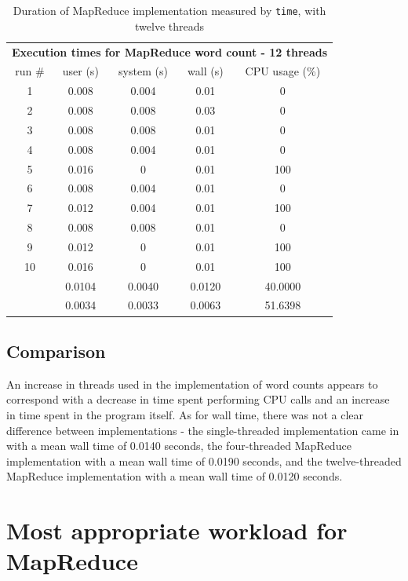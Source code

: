 \documentclass[12pt, letterpaper]{article}
\begin{document}
	\begin{table}[h]
	\centering
	\begin{tabular}{ccccc}
	\multicolumn{5}{c}{\cellcolor[HTML]{FFFFC7}\textbf{Execution times for MapReduce word count - 12 threads}} \\
	\rowcolor[HTML]{EFEFEF} 
	run \# & user (s) & system (s) & wall (s) & CPU usage (\%) \\
	1 & 0.008 & 0.004 & 0.01 & 0 \\
	2 & 0.008 & 0.008 & 0.03 & 0 \\
	3 & 0.008 & 0.008 & 0.01 & 0 \\
	4 & 0.008 & 0.004 & 0.01 & 0 \\
	5 & 0.016 & 0 & 0.01 & 100 \\
	6 & 0.008 & 0.004 & 0.01 & 0 \\
	7 & 0.012 & 0.004 & 0.01 & 100 \\
	8 & 0.008 & 0.008 & 0.01 & 0 \\
	9 & 0.012 & 0 & 0.01 & 100 \\
	10 & 0.016 & 0 & 0.01 & 100 \\
	\rowcolor[HTML]{D0F0D0} 
	\multicolumn{1}{r}{\cellcolor[HTML]{9AFF99}mean (s)} & 0.0104 & 0.0040 & 0.0120 & 40.0000 \\
	\rowcolor[HTML]{ECF4FF} 
	\multicolumn{1}{r}{\cellcolor[HTML]{DAE8FC}std. dev. (s)} & 0.0034 & 0.0033 & 0.0063 & 51.6398
	\end{tabular}
	\caption{Duration of MapReduce implementation measured by \texttt{time}, with twelve threads\label{table:MR12ImplWC}}
	\end{table}
\subsection{Comparison}
	An increase in threads used in the implementation of word counts appears to correspond with a decrease in time spent performing CPU calls and an increase in time spent in the program itself. As for wall time, there was not a clear difference between implementations - the single-threaded implementation came in with a mean wall time of 0.0140 seconds, the four-threaded MapReduce implementation with a mean wall time of 0.0190 seconds, and the twelve-threaded MapReduce implementation with a mean wall time of 0.0120 seconds.
\section{Most appropriate workload for MapReduce}
	
\end{document}
